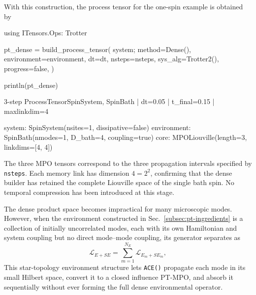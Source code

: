 With this construction, the process tensor for the one-spin example is obtained by
%
\begin{julialistingpair}[
    caption={Dense construction of the one-spin-bath process tensor.}, label={lst:pt-build-dense},
    ]
%
    \begin{juliacode}[paired]
using ITensors.Ops: Trotter

pt_dense = build_process_tensor(
    system;
    method=Dense(),
    environment=environment,
    dt=dt,
    nsteps=nsteps,
    sys_alg=Trotter{2}(),
    progress=false,
)

println(pt_dense)
    \end{juliacode}
%
    \begin{juliaoutput}[paired]
3-step ProcessTensor{SpinSystem, SpinBath} | dt=0.05 | t_final=0.15 | maxlinkdim=4

  system:      SpinSystem(nsites=1, dissipative=false)
  environment: SpinBath(nmodes=1, D_bath=4, coupling=true)
  core:        MPO{Liouville}(length=3, linkdims=[4, 4])
    \end{juliaoutput}
%
\end{julialistingpair}
%
The three MPO tensors correspond to the three propagation intervals specified by \texttt{nsteps}.
Each memory link has dimension \(4=2^2\), confirming that the dense builder has retained the complete Liouville space of the single bath spin.
No temporal compression has been introduced at this stage.

The dense product space becomes impractical for many microscopic modes.
However, when the environment constructed in Sec.~\ref{subsec:pt-ingredients} is a collection of initially uncorrelated modes, each with its own Hamiltonian and system coupling but no direct mode--mode coupling, its generator separates as
%
\begin{equation}
    \mathcal L_{E+SE}
    = \sum_{m=1}^{N_E}\mathcal L_{E_m+SE_m},
    \label{eq:ace-independent-mode-decomposition}
\end{equation}
%
This star-topology environment structure lets \texttt{ACE()} propagate each mode in its small Hilbert space, convert it to a closed influence PT-MPO, and absorb it sequentially without ever forming the full dense environmental operator.

